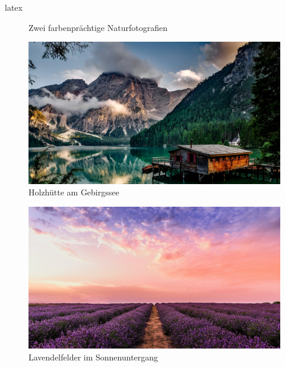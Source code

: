 \begin{showcase}
\begin{code}{latex}
\begin{figure}
\begin{minipage}[c]{0.49\columnwidth}
            \end{minipage}
            \caption{Zwei farbenprächtige Naturfotografien}
        \end{figure}
    \end{code}
    \tcblower
    \begin{center}
        \captionsetup{type=figure}
        \begin{subfigure}{0.49\columnwidth}
            \includegraphics[width=\linewidth]{assets/images/bilder/pexels-pixabay-147411.jpg}
            \caption{Holzhütte am Gebirgssee}
        \end{subfigure}
        \hfill
        \begin{subfigure}{0.49\columnwidth}
            \includegraphics[width=\linewidth]{assets/images/bilder/pexels-david-bartus-1166209.jpg}
            \caption{Lavendelfelder im Sonnenuntergang}
        \end{subfigure}
    \end{center}
\end{showcase}

